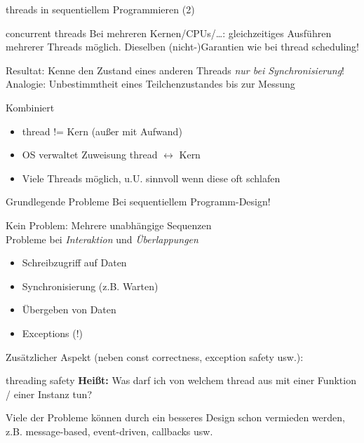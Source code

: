 \begin{frame}{threads in sequentiellem Programmieren (2)}
	\begin{block}{concurrent threads}
		Bei mehreren Kernen/CPUs/\dots: gleichzeitiges Ausführen mehrerer Threads möglich.
		Dieselben (nicht-)Garantien wie bei thread scheduling!
	\end{block}
	
	Resultat: Kenne den Zustand eines anderen Threads \emph{nur bei Synchronisierung}!\\
	Analogie: Unbestimmtheit eines Teilchenzustandes bis zur Messung
	
	\pause
	\vspace{1em}
	
	\begin{block}{Kombiniert}
		\begin{itemize}
			\item thread != Kern (außer mit Aufwand)
			\item OS verwaltet Zuweisung thread $\leftrightarrow$ Kern
			\item Viele Threads möglich, u.U. sinnvoll wenn diese oft schlafen
		\end{itemize}
	\end{block}
\end{frame}

\begin{frame}{Grundlegende Probleme}
	Bei sequentiellem Programm-Design!
	
	\vspace{1em}
	
	Kein Problem: Mehrere unabhängige Sequenzen\\
	Probleme bei \emph{Interaktion} und \emph{Überlappungen}
	\begin{itemize}
		\item Schreibzugriff auf Daten
		\item Synchronisierung (z.B. Warten)
		\item Übergeben von Daten
		\item Exceptions (!)
	\end{itemize}
	
	\vspace{1em}
	
	Zusätzlicher Aspekt (neben const correctness, exception safety usw.):
	\begin{block}{threading safety}
		\textbf{Heißt:} Was darf ich von welchem thread aus mit einer Funktion / einer Instanz tun?
	\end{block}
	
	\pause
	
	\alert{Viele der Probleme können durch ein besseres Design schon vermieden werden, z.B. message-based, event-driven, callbacks usw.}
\end{frame}


